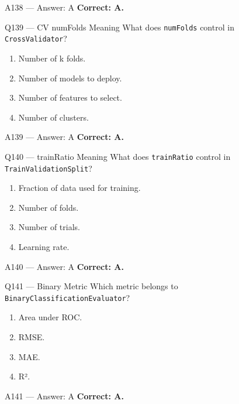 \documentclass[aspectratio=169,9pt]{beamer}
\begin{document}
	\begin{frame}{A138 --- Answer: A}
		\textbf{Correct: A.}
	\end{frame}
	
	\begin{frame}{Q139 --- CV numFolds Meaning}
		What does \texttt{numFolds} control in \texttt{CrossValidator}?
		\begin{enumerate}[label=\Alph*.]
			\item Number of k folds.
			\item Number of models to deploy.
			\item Number of features to select.
			\item Number of clusters.
		\end{enumerate}
	\end{frame}
	
	\begin{frame}{A139 --- Answer: A}
		\textbf{Correct: A.}
	\end{frame}
	
	\begin{frame}{Q140 --- trainRatio Meaning}
		What does \texttt{trainRatio} control in \texttt{TrainValidationSplit}?
		\begin{enumerate}[label=\Alph*.]
			\item Fraction of data used for training.
			\item Number of folds.
			\item Number of trials.
			\item Learning rate.
		\end{enumerate}
	\end{frame}
	
	\begin{frame}{A140 --- Answer: A}
		\textbf{Correct: A.}
	\end{frame}
	
	\begin{frame}{Q141 --- Binary Metric}
		Which metric belongs to \texttt{BinaryClassificationEvaluator}?
		\begin{enumerate}[label=\Alph*.]
			\item Area under ROC.
			\item RMSE.
			\item MAE.
			\item R².
		\end{enumerate}
	\end{frame}
	
	\begin{frame}{A141 --- Answer: A}
		\textbf{Correct: A.}
	\end{frame}
	
\end{document}
